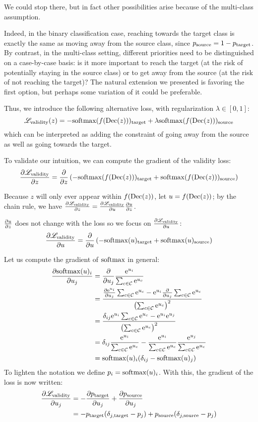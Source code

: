 \documentclass[../main.tex]{subfiles}
\begin{document}
We could stop there, but in fact other possibilities arise because of the multi-class assumption.

Indeed, in the binary classification case, reaching towards the target class is exactly the same as moving away from the source class, since $p_\source = 1 - p_\target$.
By contrast, in the multi-class setting, different priorities need to be distinguished on a case-by-case basis: is it more important to reach the target (at the risk of potentially staying in the source class) or to get away from the source (at the risk of not reaching the target)?
The natural extension we presented is favoring the first option, but perhaps some variation of it could be preferable.

Thus, we introduce the following alternative loss, with regularization $\lambda \in [0, 1]$:
\begin{equation}
    \lossval(z) = -\softmax(f(\dec(z)))_\target
+ \lambda \softmax(f(\dec(z)))_\source
\end{equation}
which can be interpreted as adding the constraint of going away from the source as well as going towards the target.

To validate our intuition, we can compute the gradient of the validity loss:
\begin{align}
    \grad{\lossval}{z}
    =  \grad{}{z} \left( - \softmax(f(\dec(z)))_\target + \softmax(f(\dec(z)))_\source \right)
\end{align}

Because $z$ will only ever appear within $f(\dec(z))$, let $u = f(\dec(z))$; by the chain rule, we have $\grad{\lossval}{z} = \grad{\lossval}{u} \grad{u}{z}$.

$\grad{u}{z}$ does not change with the loss so we focus on $\grad{\lossval}{u}$:
\begin{align*}
    \grad{\lossval}{u}
    =  \grad{}{u} \left( - \softmax(u)_\target + \softmax(u)_\source \right)
\end{align*}

Let us compute the gradient of $\softmax$ in general:
\begin{align*}
    \grad{\softmax(u)_i}{u_j}
     & = \grad{}{u_j} \frac{\eu{i}}{\seu}                                                 \\
     & = \frac{\grad{\eu{i}}{u_j} \seu - \eu{i} \grad{}{u_j} \seu}{\left( \seu \right)^2} \\
& = \frac{\dij \eu{i} \seu - \eu{i} \eu{j}}{\left(\seu \right)^{2}}           \\
& = \dij \frac{\eu{i}}{\seu} - \frac{\eu{i}}{\seu} \frac{\eu{j}}{\seu}        \\
& = \softmax(u)_i ( \dij  -  \softmax(u)_j)
\end{align*}
To lighten the notation we define $p_i = \softmax(u)_i$.
With this, the gradient of the loss is now written:
\begin{align*}
    \grad{\lossval}{u_j}
    =  - & \grad{p_\target }{u_j} + \grad{p_\source}{u_j}  \\
    =  - & p_\target (\djt - p_j) + p_\source (\djs - p_j)
\end{align*}
\end{document}
